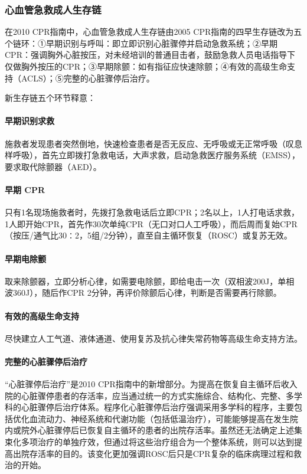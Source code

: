 \subsubsection{心血管急救成人生存链}

在2010 CPR指南中，心血管急救成人生存链由2005
CPR指南的四早生存链改为五个链环：①早期识别与呼叫：即立即识别心脏骤停并启动急救系统；②早期CPR：强调胸外心脏按压，对未经培训的普通目击者，鼓励急救人员电话指导下仅做胸外按压的CPR；③早期除颤：如有指征应快速除颤；④有效的高级生命支持（ACLS）；⑤完整的心脏骤停后治疗。

新生存链五个环节释意：

\paragraph{早期识别求救}

施救者发现患者突然倒地，快速检查患者是否无反应、无呼吸或无正常呼吸（叹息样呼吸），首先立即拨打急救电话，大声求救，启动急救医疗服务系统（EMSS），要求取代除颤器（AED）。

\paragraph{早期 CPR}

只有1名现场施救者时，先拨打急救电话后立即CPR；2名以上，1人打电话求救，1人即开始CPR，首先作30次单纯CPR（无口对口人工呼吸），而后周而复始CPR（按压/通气比30∶2，5组/2分钟），直至自主循环恢复（ROSC）或复苏无效。

\paragraph{早期电除颤}

取来除颤器，立即分析心律，如需要电除颤，即给电击一次（双相波200J，单相波360J），随后作CPR
2分钟，再评价除颤后心律，判断是否需要再行除颤。

\paragraph{有效的高级生命支持}

尽快建立人工气道、液体通道、使用复苏及抗心律失常药物等高级生命支持方法。

\paragraph{完整的心脏骤停后治疗}

“心脏骤停后治疗”是2010
CPR指南中的新增部分。为提高在恢复自主循环后收入院的心脏骤停患者的存活率，应当通过统一的方式实施综合、结构化、完整、多学科的心脏骤停后治疗体系。程序化心脏骤停后治疗强调采用多学科的程序，主要包括优化血流动力、神经系统和代谢功能（包括低温治疗），可能能够提高在发生院内或院外心脏骤停后已恢复自主循环的患者的出院存活率。虽然还无法确定上述集束化多项治疗的单独疗效，但通过将这些治疗组合为一个整体系统，则可以达到提高出院存活率的目的。该变化更加强调ROSC后只是CPR复杂的临床病理过程和救治的开始。


